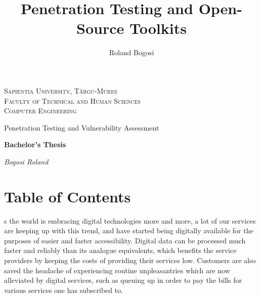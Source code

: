 \documentclass[a4paper,12pt]{article}
\author{Roland Bogosi}
\title{Penetration Testing and Open-Source Toolkits}
\begin{document}
\thispagestyle{empty}

	\begin{center}
		\textsc{\Large Sapientia University, Târgu-Mureș}\\
		\textsc{\Large Faculty of Technical and Human Sciences}\\
		\vspace{1mm}
		\textsc{\Large Computer Engineering}\\
		
		\vspace{3.4in}
		
		{\LARGE Penetration Testing and Vulnerability Assessment}
		
		\vspace{0.5in}
		
		\textbf{\Large Bachelor's Thesis}
		
		\vspace{3.5in}
	\end{center}
	
	\begin{flushright}
		{\Large \textit{Bogosi Roland}}
	\end{flushright}

\newpage
\thispagestyle{empty}
\section*{Table of Contents}

	\begingroup
	\renewcommand{\section}[2]{}
	\hypersetup{linkcolor=blue}
	\setlength{\parskip}{0em}
	\tableofcontents
	\endgroup

\newpage
\section{Introduction}

	As the world is embracing digital technologies more and more, a lot of our services are keeping up with this trend, and have started being digitally available for the purposes of easier and faster accessibility. Digital data can be processed much faster and reliably than its analogue equivalents, which benefits the service providers by keeping the costs of providing their services low. Customers are also saved the headache of experiencing routine unpleasantries which are now alleviated by digital services, such as queuing up in order to pay the bills for various services one has subscribed to.
	
\end{document}
